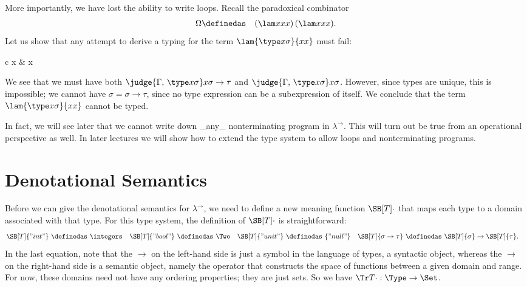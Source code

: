More importantly, we have lost the ability to write loops. Recall the paradoxical combinator
\begin{eqnarray*}
\Omega &\definedas& (\lam x{xx})\,(\lam x{xx}).
\end{eqnarray*}
Let us show that any attempt to derive a typing for the term $\lam{\type x\sigma}{xx}$ must fail:
\begin{center}
\begin{tabular}{c}
 {
   {
    x{\sigma\to\tau} &
    x\sigma
  }
}
\end{tabular}
\end{center}
We see that we must have both $\judge{\Gamma,\,\type x\sigma}x{\sigma\to\tau}$ and
$\judge{\Gamma,\,\type x\sigma}x\sigma$. However, since types are unique, this is impossible; we cannot
have $\sigma=\sigma\to\tau$, since no type expression can be a subexpression
of itself. We conclude that the term $\lam{\type x\sigma}{xx}$ cannot be typed.

In fact, we will see later
that we cannot write down _any_ nonterminating program in $\lambda^\to$.
This will turn out be true from an operational perspective as well.
In later lectures we will show how to extend the type
system to allow loops and nonterminating programs.

\section{Denotational Semantics}

Before we can give the denotational semantics for $\lambda^\to$,
we need to define a new meaning function $\SB[T]\cdot$ that maps each
type to a domain associated with that type. For this type system,
the definition of $\SB[T]\cdot$ is straightforward:
\begin{align*}
\SB[T]{"int"}\ &\definedas\ \integers &
\SB[T]{"bool"}\ &\definedas\ \Two &
\SB[T]{"unit"}\ &\definedas\ \{"null"\} &
\SB[T]{\sigma\to\tau}\ &\definedas\ \SB[T]{\sigma}\to\SB[T]{\tau}.
\end{align*}
In the last equation, note that the $\to$ on the left-hand side is just a symbol
in the language of types, a syntactic object, whereas the $\to$ on the
right-hand side is a semantic object, namely the operator that constructs
the space of functions between a given domain and range.
For now, these domains need not have any ordering properties; they are just
sets. So we have $\Tr T\cdot:\Type\to\Set$.

